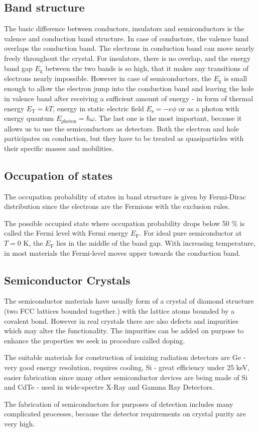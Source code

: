 \subsection{Band structure}
The basic difference between conductors, insulators and semiconductors is the valence and conduction band structure. In case of conductors, the valence band overlaps the conduction band. The electrons in conduction band can move nearly freely throughout the crystal. For insulators, there is no overlap, and the energy band gap $E_{\textrm{g}}$ between the two bands is so high, that it makes any transitions of electrons nearly impossible. However in case of  semiconductors, the $E_{\textrm{g}}$ is small enough to allow the electron jump into the conduction band and leaving the hole in valence band after receiving a sufficient amount of energy - in form of thermal energy $E_{\textrm{T}} = kT$, energy in static electric field $E_{\textrm{s}} = -e\phi$ or as a photon with energy quantum $E_{\textrm{photon}} = \hbar \omega$. The last one is the most important, because it allows us to use the semiconductors as detectors. Both the electron and hole participates on conduction, but they have to be treated as quasiparticles with their specific masses and mobilities.


\subsection{Occupation of states}
The occupation probability of states in band structure is given by Fermi-Dirac distribution since the electrons are the Fermions with the exclusion rules. 
\par
The possible occupied state where occupation probability drops below 50 $\%$ is called the Fermi level with Fermi energy $E_{\textrm{F}}$. 
For ideal pure semiconductor at $T=0$ K, the $E_{\textrm{F}}$ lies in the middle of the band gap. With increasing temperature, in most materials the Fermi-level moves upper towards the conduction band.

\subsection{Semiconductor Crystals}
The semiconductor materials have usually form of a crystal of diamond structure (two FCC lattices bounded together.) with the lattice atoms bounded by a covalent bond. However in real crystals there are also defects and impurities which may alter the functionality. The impurities can be added on purpose to enhance the properties we seek in procedure called doping. 
\par
The suitable materials for construction of ionizing radiation detectors are Ge - very good energy resolution, requires cooling, Si - great efficiency under 25 keV, easier fabrication since many other semiconductor devices are being made of Si and CdTe - used in wide-spectre X-Ray and Gamma Ray Detectors.
\par
The fabrication of semiconductors for purposes of detection includes many complicated processes, because the detector requirements on crystal purity are very high.

